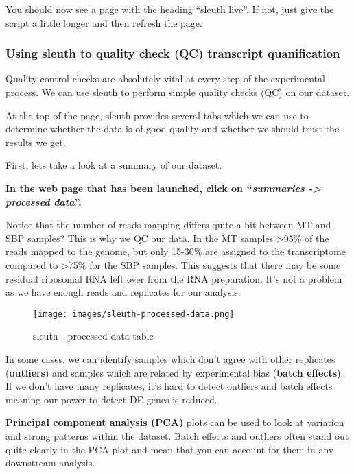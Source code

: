 \documentclass[11pt]{article}
\begin{document}
    You should now see a page with the heading ``sleuth live''. If not, just
give the script a little longer and then refresh the page.

\newpage

    \hypertarget{using-sleuth-to-quality-check-qc-transcript-quanification}{%
\subsubsection{Using sleuth to quality check (QC) transcript
quanification}\label{using-sleuth-to-quality-check-qc-transcript-quanification}}

Quality control checks are absolutely vital at every step of the
experimental process. We can use sleuth to perform simple quality checks
(QC) on our dataset.

At the top of the page, sleuth provides several tabs which we can use to
determine whether the data is of good quality and whether we should
trust the results we get.

First, lets take a look at a summary of our dataset.

\textbf{In the web page that has been launched, click on
``\textit{summaries -\textgreater{} processed data}''.}

Notice that the number of reads mapping differs quite a bit between MT
and SBP samples? This is why we QC our data. In the MT samples
\textgreater95\% of the reads mapped to the genome, but only 15-30\% are
assigned to the transcriptome compared to \textgreater75\% for the SBP
samples. This suggests that there may be some residual ribosomal RNA
left over from the RNA preparation. It's not a problem as we have enough
reads and replicates for our analysis.

    \begin{figure}[!h]
\centering
\texttt{[image: images/sleuth-processed-data.png]}
\caption{sleuth - processed data table}
\end{figure}

    In some cases, we can identify samples which don't agree with other
replicates (\textbf{outliers}) and samples which are related by
experimental bias (\textbf{batch effects}). If we don't have many
replicates, it's hard to detect outliers and batch effects meaning our
power to detect DE genes is reduced.

\textbf{Principal component analysis (PCA)} plots can be used to look at
variation and strong patterns within the dataset. Batch effects and
outliers often stand out quite clearly in the PCA plot and mean that you
can account for them in any downstream analysis.
\end{document}
